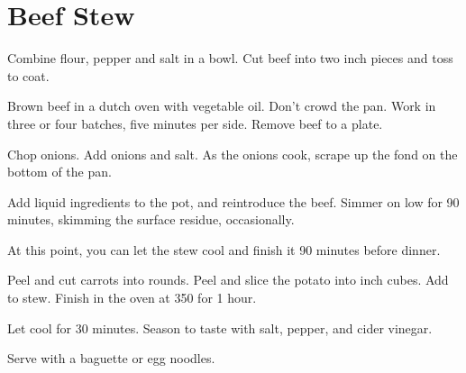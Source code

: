 \section{Beef Stew}
\begin{recipe}



Combine flour, pepper and salt in a bowl. Cut beef into two inch pieces and toss to coat. 


Brown beef in a dutch oven with vegetable oil. Don't crowd the pan. 
Work in three or four batches, five minutes per side. Remove beef to a plate. 


Chop onions. Add onions and salt. As the onions cook, scrape up the fond on the bottom 
of the pan. 


Add liquid ingredients to the pot, and reintroduce the beef. 
Simmer on low for 90 minutes, skimming the surface residue, occasionally. 

At this point, you can let the stew cool and finish it 90 minutes before dinner. 


Peel and cut carrots into rounds. Peel and slice the potato into  inch cubes. 
Add to stew. Finish in the oven at 350\degree{} for 1 hour.

Let cool for 30 minutes. Season to taste with salt, pepper, and cider vinegar. 

Serve with a baguette or egg noodles.

\end{recipe}
